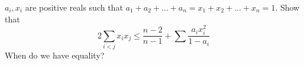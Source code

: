 $a_i, x_i$ are positive reals such that $a_1 + a_2 + ... + a_n = x_1 + x_2 + ... + x_n = 1$. Show that
\[ 2 \sum_{i<j} x_ix_j \leq \frac{n-2}{n-1} + \sum \frac{a_ix_i ^2}{1-a_i} \]
When do we have equality?